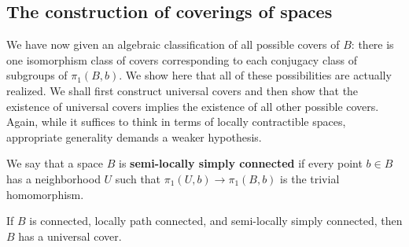 \subsection{The construction of coverings of spaces}
We have now given an algebraic classification of all possible covers of $B$: there is one isomorphism class of covers corresponding to each conjugacy class
of subgroups of $\pi_1(B,b)$. We show here that all of these possibilities are actually realized. We shall first construct universal covers and then show that the existence of universal covers implies the existence of all other possible covers. Again, while it suffices to think in terms of locally contractible spaces, appropriate generality demands a weaker hypothesis.
\begin{definition}
We say that a space $B$ is \textbf{semi-locally simply connected} if every point $b\in B$ has a neighborhood $U$ such that $\pi_1(U,b)\to\pi_1(B,b)$ is the trivial homomorphism.
\end{definition}
\begin{theorem}
If $B$ is connected, locally path connected, and semi-locally simply connected, then $B$ has a universal cover.
\end{theorem}
